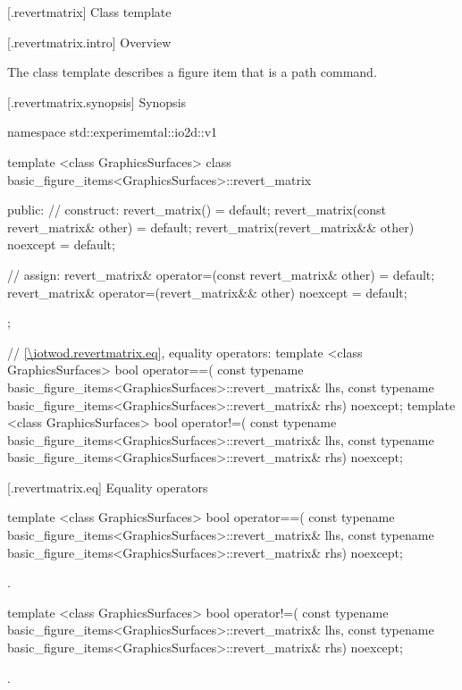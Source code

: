  [\iotwod.revertmatrix] {Class template }

 [\iotwod.revertmatrix.intro] {Overview}

\pnum
{}
The class template  describes a figure item that is a path command.

 [\iotwod.revertmatrix.synopsis] {Synopsis}
\begin{codeblock}
namespace std::experimemtal::io2d::v1 {
  template <class GraphicsSurfaces>
  class basic_figure_items<GraphicsSurfaces>::revert_matrix {
  public:
    // construct:
    revert_matrix() = default;
    revert_matrix(const revert_matrix& other) = default;
    revert_matrix(revert_matrix&& other) noexcept = default;

    // assign:
    revert_matrix& operator=(const revert_matrix& other) = default;
    revert_matrix& operator=(revert_matrix&& other) noexcept = default;
  };

  // \ref{\iotwod.revertmatrix.eq}, equality operators:
  template <class GraphicsSurfaces>
  bool operator==(
    const typename basic_figure_items<GraphicsSurfaces>::revert_matrix& lhs,
    const typename basic_figure_items<GraphicsSurfaces>::revert_matrix& rhs) 
    noexcept;  
  template <class GraphicsSurfaces>
  bool operator!=(
    const typename basic_figure_items<GraphicsSurfaces>::revert_matrix& lhs,
    const typename basic_figure_items<GraphicsSurfaces>::revert_matrix& rhs) 
    noexcept;
}
\end{codeblock}

 [\iotwod.revertmatrix.eq] {Equality operators}%

%
\begin{itemdecl}
template <class GraphicsSurfaces>
bool operator==(
  const typename basic_figure_items<GraphicsSurfaces>::revert_matrix& lhs,
  const typename basic_figure_items<GraphicsSurfaces>::revert_matrix& rhs)
  noexcept;
\end{itemdecl}
\begin{itemdescr}
\pnum
\returns {}.
\end{itemdescr}

%
\begin{itemdecl}
template <class GraphicsSurfaces>
bool operator!=(
  const typename basic_figure_items<GraphicsSurfaces>::revert_matrix& lhs,
  const typename basic_figure_items<GraphicsSurfaces>::revert_matrix& rhs)
  noexcept;
\end{itemdecl}
\begin{itemdescr}
\pnum
\returns {}.
\end{itemdescr}

